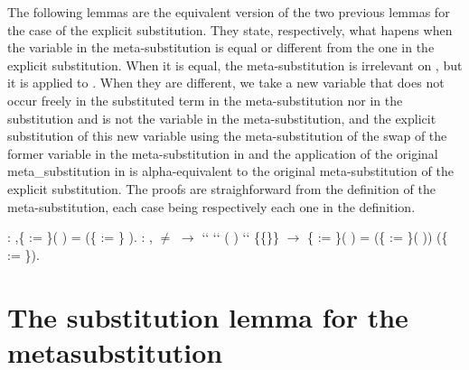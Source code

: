 The following lemmas are the equivalent version of the two previous lemmas for the case of the explicit substitution. They state, respectively, what hapens when the variable in the meta-substitution is equal or different from the one in the explicit substitution. When it is equal, the meta-substitution is irrelevant on , but it is applied to . When they are different, we take a new variable that does not occur freely in the substituted term in the meta-substitution nor in the substitution and is not the variable in the meta-substitution, and the explicit substitution of this new variable using the meta-substitution of the swap of the former variable in the meta-substitution in  and the application of the original meta\_substitution in  is alpha-equivalent to the original meta-substitution of the explicit substitution. The proofs are straighforward from the definition of the meta-substitution, each case being respectively each one in the definition. \newline
\begin{coqdoccode}
\coqdocemptyline
\coqdocnoindent
{}  : \coqdockw{\ensuremath{\forall}}    ,\{ := \}(   ) =    (\{ := \} ).\coqdoceol
\coqdocemptyline
\coqdocnoindent
{}  : \coqdockw{\ensuremath{\forall}}      ,  \ensuremath{\not=}  \ensuremath{\rightarrow}  ``   ``  (   ) `` \{\{\}\} \ensuremath{\rightarrow} \{ := \}(   ) =  (\{ := \}(   ))  (\{ := \}).\coqdoceol
\coqdocemptyline
\end{coqdoccode}
\section{The substitution lemma for the metasubstitution}



